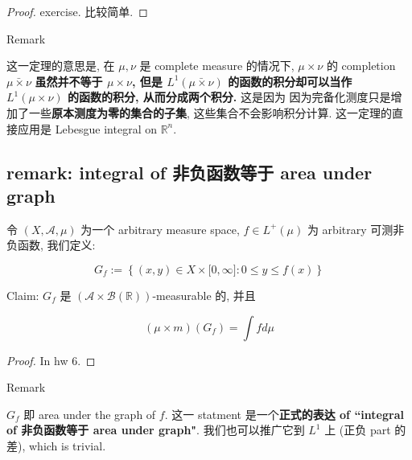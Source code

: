 \documentclass{qlnotes-export}
\begin{document}
\begin{proof}

exercise. 比较简单.

\end{proof}

\begin{qlremark}{Remark}

这一定理的意思是, 在 \(\mu,\nu\) 是 complete measure 的情况下, \(\mu \times \nu\) 的 completion \(\bar{\mu\times\nu}\) \textbf{虽然并不等于 \(\mu \times \nu\), 但是 \(L^{1}(\bar{\mu\times\nu})\) 的函数的积分却可以当作 \(L^{1}(\mu \times \nu)\) 的函数的积分, 从而分成两个积分.} 这是因为 因为完备化测度只是增加了一些\textbf{原本测度为零的集合的子集}, 这些集合不会影响积分计算. 这一定理的直接应用是 Lebesgue integral on \({\mathbb{R}}^{n}\).

\end{qlremark}

\subsection{remark: integral of 非负函数等于 area under graph}\label{remark-integral-of-ux975eux8d1fux51fdux6570ux7b49ux4e8e-area-under-graph}

\begin{theorem}

令 \((X,\mathcal{A},\mu)\) 为一个 arbitrary measure space, \(f \in L^{+}(\mu)\) 为 arbitrary 可测非负函数, 我们定义:

\[G_{f} := \left\{ {(x,y) \in X \times \lbrack 0,\infty\rbrack:0 \leq y \leq f(x)} \right\}\]

Claim: \(G_{f}\) 是 \((\mathcal{A} \times \mathcal{B}({\mathbb{R}}))\)-measurable 的, 并且

\[(\mu \times m)(G_{f}) = \int f d\mu\]

\end{theorem}

\begin{proof}

In hw 6.

\end{proof}

\begin{qlremark}{Remark}

\(G_{f}\) 即 area under the graph of \(f\). 这一 statment 是一个\textbf{正式的表达 of ``integral of 非负函数等于 area under graph"}. 我们也可以推广它到 \(L^{1}\) 上 (正负 part 的差), which is trivial.

\end{qlremark}
\end{document}

